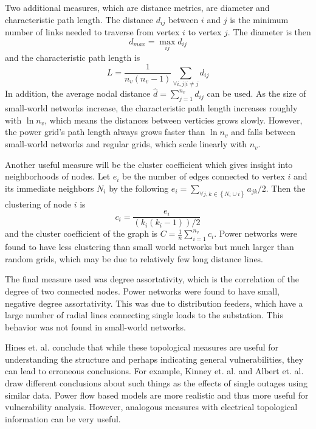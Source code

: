 Two additional measures, which are distance metrics, are diameter and characteristic path length.  The distance $d_{ij}$ between $i$ and $j$ is the minimum number of links needed to traverse from vertex $i$ to vertex $j$.  The diameter is then 
\begin{equation}
d_{max} = \max_{ij} d_{ij}
\end{equation}
 and the characteristic path length is 
\begin{equation}
L = \frac{1}{n_v (n_v -1)} \sum_{\forall i,j | i \neq j} d_{ij}
\end{equation}
In addition, the average nodal distance $\hat{d} = \sum_{j=1}^{n_v} d_{ij}$ can be used.  As the size of small-world networks increase, the characteristic path length increases roughly with $\ln n_v$, which means the distances between verticies grows slowly.  However, the power grid's path length always grows faster than $\ln n_v$ and falls between small-world networks and regular grids, which scale linearly with $n_v$.

Another useful measure will be the cluster coefficient which gives insight into neighborhoods of nodes.  Let $e_i$ be the number of edges connected to vertex $i$ and its immediate neighbors $N_i$ by the following $e_i =\sum_{\forall j,k \in \left\{ N_i \cup i \right\}} a_{jk}/2$.  Then the clustering of node $i$ is
\begin{equation}
c_i = \frac{e_i}{(k_i(k_i-1))/2}
\end{equation}
and the cluster coefficient of the graph is $C = \frac{1}{n} \sum_{i=1}^{n_v} c_i$.  Power networks were found to have less clustering than small world networks but much larger than random grids, which may be due to relatively few long distance lines.

The final measure used was degree assortativity, which is the correlation of the degree of two connected nodes.  Power networks were found to have small, negative degree assortativity.  This was due to distribution feeders, which have a large number of radial lines connecting single loads to the substation.  This behavior was not found in small-world networks.

Hines et. al. \cite{hines_2010} conclude that while these topological measures are useful for understanding the structure and perhaps indicating general vulnerabilities, they can lead to erroneous conclusions.  For example, Kinney et. al. \cite{kinney_2005} and Albert et. al. \cite{albert_2004} draw different conclusions about such things as the effects of single outages using similar data.  Power flow based models are more realistic and thus more useful for vulnerability analysis.  However, analogous measures with electrical topological information can be very useful. \endnote{}


